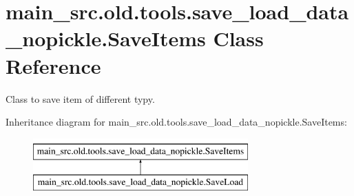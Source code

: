\hypertarget{classmain__src_8old_1_1tools_1_1save__load__data__nopickle_1_1SaveItems}{\section{main\-\_\-src.\-old.\-tools.\-save\-\_\-load\-\_\-data\-\_\-nopickle.\-Save\-Items Class Reference}
\label{classmain__src_8old_1_1tools_1_1save__load__data__nopickle_1_1SaveItems}
}


Class to save item of different typy.  


Inheritance diagram for main\-\_\-src.\-old.\-tools.\-save\-\_\-load\-\_\-data\-\_\-nopickle.\-Save\-Items\-:\begin{figure}[H]
\begin{center}
\leavevmode
\includegraphics[height=2.000000cm]{classmain__src_8old_1_1tools_1_1save__load__data__nopickle_1_1SaveItems}
\end{center}
\end{figure}
